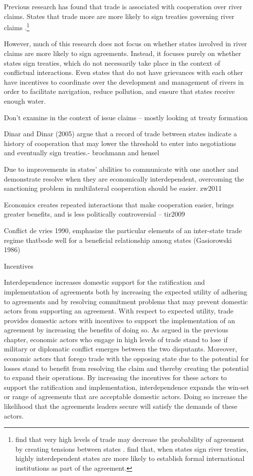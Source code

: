 Previous research has found that trade is associated with cooperation over river claims. States that trade more are more likely to sign treaties governing river claims \citep{dinar2011, espey2004, tir2009}.\footnote{\citet{dinar2011} find that very high levels of trade may decrease the probability of agreement by creating tensions between states \citep[e.g.][]{barbieri2002}. \citet{stinnett2009} find that, when states sign river treaties, highly interdependent states are more likely to establish formal international institutions as part of the agreement.}
	
	However, much of this research does not focus on whether states involved in river claims are more likely to sign agreements. Instead, it focuses purely on whether states sign treaties, which do not necessarily take place in the context of conflictual interactions. Even states that do not have grievances with each other have incentives to coordinate over the development and management of rivers in order to facilitate navigation, reduce pollution, and ensure that states receive enough water.  
	
	Don’t examine in the context of issue claims – mostly looking at treaty formation 
	
	Dinar and Dinar (2005) argue that a record of trade between states indicate a history of cooperation that may lower the threshold to enter into negotiations and eventually sign treaties.- brochmann and hensel
	
	Due to improvements in states’ abilities to communicate with one another and demonstrate resolve when they are economically interdependent, overcoming the sanctioning problem in multilateral cooperation should be easier.  zw2011
	
	Economics creates repeated interactions that make cooperation easier, brings greater benefits, and is less politically controversial – tir2009 
	
	Conflict de vries 1990, emphasize the particular elements of an inter-state trade regime thatbode well for a beneficial relationship among states (Gasiorowski 1986)
	
	Incentives
	
	Interdependence increases domestic support for the ratification and implementation of agreements both by increasing the expected utility of adhering to agreements and by resolving commitment problems that may prevent domestic actors from supporting an agreement. With respect to expected utility, trade provides domestic actors with incentives to support the implementation of an agreement by increasing the benefits of doing so. As argued in the previous chapter, economic actors who engage in high levels of trade stand to lose if military or diplomatic conflict emerges between the two disputants. Moreover, economic actors that forego trade with the opposing state due to the potential for losses stand to benefit from resolving the claim and thereby creating the potential to expand their operations. By increasing the incentives for these actors to support the ratification and implementation, interdependence expands the win-set or range of agreements that are acceptable domestic actors. Doing so increase the likelihood that the agreements leaders secure will satisfy the demands of these actors.
	
